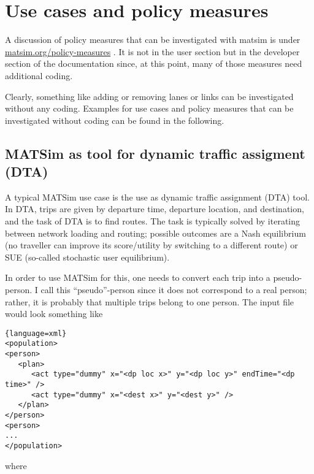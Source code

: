 \chapter{Use cases and policy measures}


A discussion of policy measures that can be investigated with matsim is under \href{http://matsim.org/policy-measures}{matsim.org/policy-measures}  . It is not in the user section but in the developer section of  the documentation since, at this point, many of those measures need additional coding. 

Clearly, something like adding or removing lanes or  links can be investigated without any coding.  Examples for use cases and policy measures that can be investigated without coding can be found in the following.

\section{MATSim as tool for dynamic traffic assigment (DTA)}


A typical MATSim use case is the use as dynamic traffic assignment (DTA) tool.  In DTA, trips are given by departure time, departure location, and destination, and the task of DTA is to find routes.  The task is typically solved by iterating between network loading and routing; possible outcomes are a Nash equilibrium (no traveller can improve its score/utility by switching to a different route) or SUE (so-called stochastic user equilibrium).

In order to use MATSim for this, one needs to convert each trip into a pseudo-person.  I call this ``pseudo''-person since it does not correspond to a real person; rather, it is probably that multiple trips belong to one person.  The input file would look something like
\begin{lstlisting}{language=xml}
<population>
<person>
   <plan>
      <act type="dummy" x="<dp loc x>" y="<dp loc y>" endTime="<dp time>" />
      <act type="dummy" x="<dest x>" y="<dest y>" />
   </plan>
</person>
<person>
...
</population>
\end{lstlisting}
where

